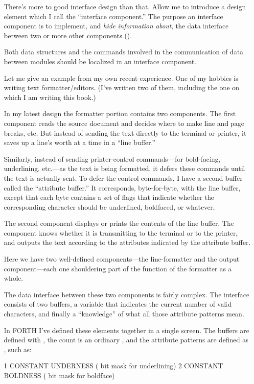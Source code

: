 There's more to good interface design than that. Allow me to introduce
a design element which I call the ``interface component.'' The purpose
an interface component is to implement, and \emph{hide information
about}, the data interface between two or more other components
().


\begin{tip}
Both data structures and the commands involved in the communication of
data between modules should be localized in an interface component.
\end{tip}

Let me give an example from my own recent experience. One of my hobbies
is writing text formatter/editors. (I've written two of them, including
the one on which I am writing this book.)

In my latest design the formatter portion contains two components.
The first component reads the source document and decides where to
make line and page breaks, etc. But instead of sending the text directly to
the terminal or printer, it saves up a line's worth at a time in a ``line
buffer.''

Similarly, instead of sending printer-control commands---for
bold-facing, underlining, etc.---as the text is being formatted, it
defers these commands until the text is actually sent. To defer the
control commands, I have a second buffer called the ``attribute
buffer.'' It corresponds, byte-for-byte, with the line buffer, except
that each byte contains a set of flags that indicate whether the
corresponding character should be underlined, boldfaced, or whatever.

The second component displays or prints the contents of the line
buffer. The component knows whether it is transmitting to the terminal
or to the printer, and outputs the text according to the attributes
indicated by the attribute buffer.

Here we have two well-defined components---the line-formatter and
the output component---each one shouldering part of the function of the
formatter as a whole.

The data interface between these two components is fairly complex.
The interface consists of two buffers, a variable that indicates the current
number of valid characters, and finally a ``knowledge'' of what all those
attribute patterns mean.

In FORTH I've defined these elements together in a single screen.
The buffers are defined with , the count is an ordinary
, and the attribute patterns are defined as ,
such as:
\begin{Code}
1 CONSTANT UNDERNESS ( bit mask for underlining)
2 CONSTANT BOLDNESS ( bit mask for boldface)
\end{Code}

